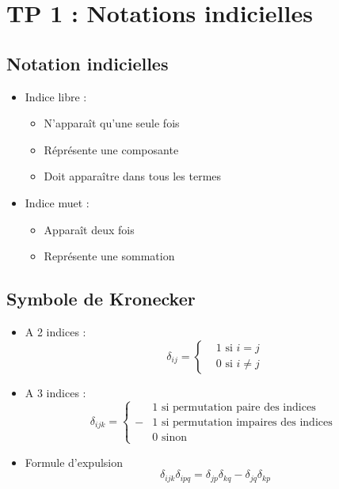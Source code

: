 \section*{TP 1 : Notations indicielles}

\subsection*{Notation indicielles}
\begin{multicols}{2}
	\begin{itemize}
		\item	Indice libre : 
		      \begin{itemize}
		      	\item N'apparaît qu'une seule fois
		      	\item Réprésente une composante
		      	\item Doit apparaître dans tous les termes
		      \end{itemize}
		      		
		\item Indice muet : 
		      \begin{itemize}
		      	\item Apparaît deux fois
		      	\item Représente une sommation
		      \end{itemize}
	\end{itemize}
\end{multicols}

\subsection*{Symbole de Kronecker}
\begin{itemize}
	\item A 2 indices :
	      \begin{equation}
	      	\delta _{ij} = 
	      	\left\{
	      	\begin{aligned}
	      		  & 1 \mbox{ si } i = j    \\
	      		  & 0 \mbox{ si } i \neq j 
	      	\end{aligned}
	      	\right.
	      \end{equation}
	      	
	\item A 3 indices :
	      \begin{equation}
	      	\delta _{ijk} = 
	      	\left\{
	      	\begin{aligned}
	      		  & 1 \mbox{ si permutation paire des indices}     \\
	      		- & 1 \mbox{ si permutation impaires des indices } \\
	      		  & 0 \mbox{ sinon }                               
	      	\end{aligned}
	      	\right.
	      \end{equation}
	      
	\item Formule d'expulsion 
	      \begin{equation}
	      	\delta _{ijk} \delta _{ipq} = \delta _{jp} \delta _{kq} - \delta _{jq} \delta _{kp}
	      \end{equation}
\end{itemize}

